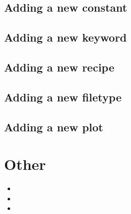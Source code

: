 \documentclass[a4paper,10pt,english]{report}
\begin{document}
\section{Adding a new constant}
\label{\detokenize{dev/adding_new_constant:adding-a-new-constant}}\label{\detokenize{dev/adding_new_constant:add-new-constant}}\label{\detokenize{dev/adding_new_constant::doc}}

\section{Adding a new keyword}
\label{\detokenize{dev/adding_new_keyword:adding-a-new-keyword}}\label{\detokenize{dev/adding_new_keyword:adding-new-keyword}}\label{\detokenize{dev/adding_new_keyword::doc}}

\section{Adding a new recipe}
\label{\detokenize{dev/adding_new_recipe:adding-a-new-recipe}}\label{\detokenize{dev/adding_new_recipe:add-new-recipe}}\label{\detokenize{dev/adding_new_recipe::doc}}

\section{Adding a new filetype}
\label{\detokenize{dev/adding_new_filetype:adding-a-new-filetype}}\label{\detokenize{dev/adding_new_filetype:add-new-filetype}}\label{\detokenize{dev/adding_new_filetype::doc}}

\section{Adding a new plot}
\label{\detokenize{dev/adding_new_plot:adding-a-new-plot}}\label{\detokenize{dev/adding_new_plot:add-new-plot}}\label{\detokenize{dev/adding_new_plot::doc}}

\chapter{Other}
\label{\detokenize{index:other}}\begin{itemize}
\item {} 

\item {} 

\item {} 

\end{itemize}
\end{document}
